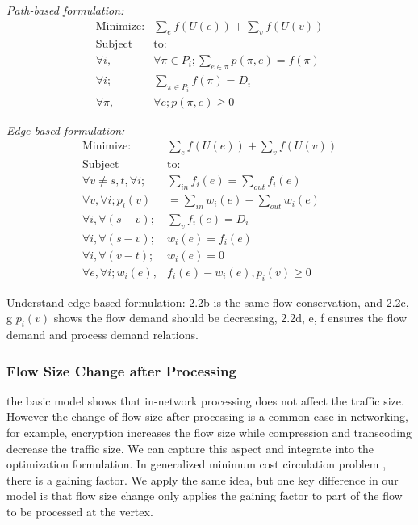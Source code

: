\begin{minipage}[t]{0.45\textwidth}
\textit{Path-based formulation:}
  \begin{subequations}
\begin{align}
\text{Minimize:} & \sum \limits_{e} f(U(e)) + \sum \limits_{v} f(U(v)) \\  \nonumber
\text{Subject } &\text{to:} \\
\forall i,& \forall \pi\in P_i; \sum \limits_{e\in \pi} p(\pi, e) = f(\pi)\\
\forall i;& \sum\limits_{\pi\in P_i}f(\pi) = D_i\\
\forall \pi,&\forall e;p(\pi,e) \geq 0
\end{align}
\end{subequations}
  \end{minipage}
\hspace{0.1cm}
\begin{minipage}[t]{0.50\textwidth}
\textit{Edge-based formulation:}
  \begin{subequations}
\begin{align}
\text{Minimize:}&\sum \limits_{e} f(U(e)) + \sum \limits_{v} f(U(v)) \\ \nonumber
\text{Subject } &\text{to:}\\
\forall v \not= s,t,\forall i;& \sum\limits_{in}  f_i(e)=  \sum\limits_{out} f_i(e)\\
\forall v,\forall  i; p_i(v)& = \sum\limits_{in} w_i(e) - \sum\limits_{out} w_i(e) \\
\forall  i, \forall (s-v); &\sum\limits_v f_i(e)= D_i\\
\forall  i,\forall (s-v);& w_i(e)= f_i(e)\\
\forall  i,\forall (v-t);& w_i(e)= 0\\
\forall e,\forall i;w_i(e),& f_i(e)-w_i(e), p_i(v) \geq 0
\end{align}
\end{subequations}
\end{minipage}

Understand edge-based formulation: 2.2b is the same flow conservation, and 2.2c, g $p_i(v)$ shows the flow demand should be decreasing, 2.2d, e, f ensures the flow demand and process demand relations. 

\subsubsection{Flow Size Change after Processing}
the basic model shows that in-network processing does not affect the traffic size. However the change of flow size after processing is a common case in networking, for example, encryption increases the flow size while compression and transcoding decrease the traffic size\cite{Mogul1997}. We can capture this aspect and integrate into the optimization formulation. In generalized minimum cost circulation problem \cite{Wayne1999}, there is a gaining factor. We apply the same idea, but one key difference in our model is that flow size change only applies the gaining factor to part of the flow to be processed at the vertex. 

